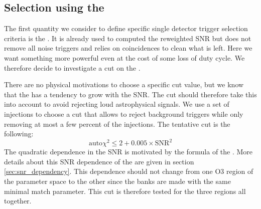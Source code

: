 



\clearpage\newpage
\subsection{Selection using the \texorpdfstring{\achi}{autoChi2}}
\label{sec:selec_autochi2}
The first quantity we consider to define specific single detector trigger selection criteria is the \achi.
It is already used to computed the reweighted SNR but does not remove all noise triggers and relies on coincidences to clean what is left.
Here we want something more powerful even at the cost of some loss of duty cycle.
We therefore decide to investigate a cut on the \achi.

There are no physical motivations to choose a specific cut value, but we know that the \achi has a tendency to grow with the SNR.
The cut should therefore take this into account to avoid rejecting loud astrophysical signals.
We use a set of injections to choose a cut that allows to reject background triggers while only removing at most a few percent of the injections.
The tentative cut is the following:
%
\begin{equation}
    \text{auto}\chi^2 \leq 2+0.005 \times \text{SNR}^2
\end{equation}
%
The quadratic dependence in the SNR is motivated by the formula of the \achi.
More details about this SNR dependence of the \achi are given in section \ref{sec:snr_dependency}.
This dependence should not change from one O3 region of the parameter space to the other since the banks are made with the same minimal match parameter.
This cut is therefore tested for the three regions all together.

